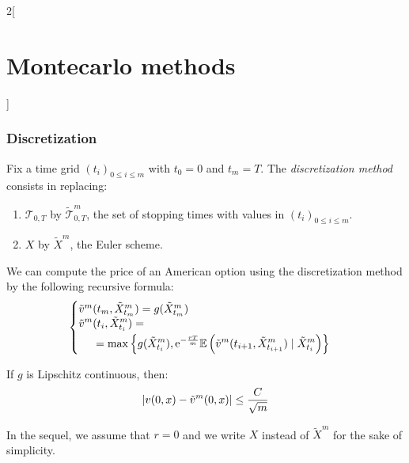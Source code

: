 \documentclass[../../../main_math.tex]{subfiles}
\begin{document}
\begin{multicols}{2}[\section{Montecarlo methods}]
  \subsubsection{Discretization}
  \begin{definition}
    Fix a time grid ${(t_i)}_{0\leq i\leq m}$ with $t_0=0$ and $t_m=T$. The \emph{discretization method} consists in replacing:
    \begin{enumerate}
      \item $\mathcal{T}_{0,T}$ by $\tilde{\mathcal{T}}_{0,T}^m$, the set of stopping times with values in ${(t_i)}_{0\leq i\leq m}$.
      \item $X$ by $\tilde{X}^m$, the Euler scheme.
    \end{enumerate}
  \end{definition}
  \begin{proposition}
    We can compute the price of an American option using the discretization method by the following recursive formula:
    $$
      \begin{cases}
        \tilde{v}^m(t_m,\tilde{X}^m_{t_m})=g(\tilde{X}^m_{t_m}) \\
        \begin{aligned}
          \tilde{v}^m & (t_i,\tilde{X}^m_{t_i})=                                                                                                                       \\
                      & =\max\left\{ g(\tilde{X}^m_{t_i}),\mathrm{e}^{-\frac{rT}{m}}\mathbb{E}\left(\tilde{v}^m(t_{i+1},\tilde{X}^m_{t_{i+1}})\mid \tilde{X}^m_{t_i}\right)\right\}
        \end{aligned}
      \end{cases}
    $$
  \end{proposition}
  \begin{proposition}
    If $g$ is Lipschitz continuous, then:
    $$
      \abs{v(0,x)-\tilde{v}^m(0,x)}\leq \frac{C}{\sqrt{m}}
    $$
  \end{proposition}
  \begin{remark}
    In the sequel, we assume that $r = 0$ and we write $X$ instead of $\tilde{X}^m$ for the sake of simplicity.
  \end{remark}

\end{multicols}
\end{document}
